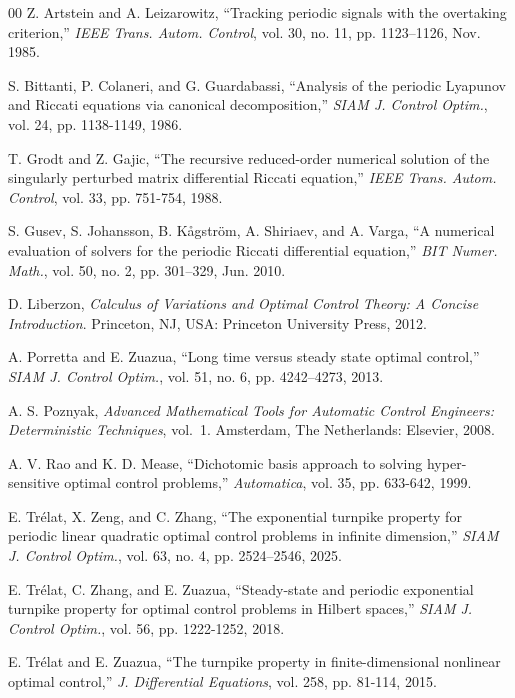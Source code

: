 \documentclass{IEEEtran}
\begin{document}
	
	\begin{thebibliography}{00}
		Z. Artstein and A. Leizarowitz,
		``Tracking periodic signals with the overtaking criterion,''
		\textit{IEEE Trans. Autom. Control}, vol. 30, no. 11, pp. 1123--1126, Nov. 1985.
		
		S. Bittanti, P. Colaneri, and G. Guardabassi,
		``Analysis of the periodic Lyapunov and Riccati equations via canonical decomposition,''
		\textit{SIAM J. Control Optim.}, vol. 24, pp. 1138-1149, 1986.
		
		T. Grodt and Z. Gajic,
		``The recursive reduced-order numerical solution of the singularly perturbed matrix differential Riccati equation,''
		\textit{IEEE Trans. Autom. Control}, vol. 33, pp. 751-754, 1988.
		
		S. Gusev, S. Johansson, B. Kågström, A. Shiriaev, and A. Varga,
		``A numerical evaluation of solvers for the periodic Riccati differential equation,''
		\textit{BIT Numer. Math.}, vol. 50, no. 2, pp. 301--329, Jun. 2010.
		
		D. Liberzon,
		\textit{Calculus of Variations and Optimal Control Theory: A Concise Introduction}.
		Princeton, NJ, USA: Princeton University Press, 2012.
		
		A. Porretta and E. Zuazua,
		``Long time versus steady state optimal control,''
		\textit{SIAM J. Control Optim.}, vol. 51, no. 6, pp. 4242--4273, 2013.
		
		A. S. Poznyak, \textit{Advanced Mathematical Tools for Automatic Control
			Engineers: Deterministic Techniques}, vol.~1.  Amsterdam, The Netherlands:
		Elsevier, 2008.
		
		A. V. Rao and K. D. Mease,
		``Dichotomic basis approach to solving hyper-sensitive optimal control problems,''
		\textit{Automatica}, vol. 35, pp. 633-642, 1999.
		
		E. Tr\'{e}lat, X. Zeng, and C. Zhang,
		``The exponential turnpike property for periodic linear quadratic optimal control problems in infinite dimension,''
		\textit{SIAM J. Control Optim.}, vol. 63, no. 4, pp. 2524--2546, 2025.
		
		E. Tr\'{e}lat, C. Zhang, and E. Zuazua,
		``Steady-state and periodic exponential turnpike property for optimal control problems in Hilbert spaces,''
		\textit{SIAM J. Control Optim.}, vol. 56, pp. 1222-1252, 2018.
		
		E. Tr\'{e}lat and E. Zuazua,
		``The turnpike property in finite-dimensional nonlinear optimal control,''
		\textit{J. Differential Equations}, vol. 258, pp. 81-114, 2015.
		

\end{thebibliography}
\end{document}
